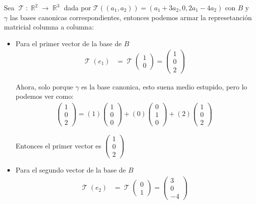 \documentclass[12pt, fleqn]{report}                             %
\theoremstyle{break}                                            %
\DeclareMathOperator \Reals        {\mathbb{R}}                 %
\DeclareMathOperator \LinTrans      {\mathcal{T}}               %
\newcommand{\Wrap}[1]           {\left( #1 \right)}             %
\newcommand{\FnLinTrans}[1]{\mathcal{T}\Wrap{#1}}               %
\newcommand{\pVector}[1]                                        %
        { \ensuremath{\begin{pmatrix}#1\end{pmatrix}} }             %
\begin{document}
                    Sea $\LinTrans: \Reals^2 \to \Reals^3$ dada por $\FnLinTrans{(a_1, a_2)} = (a_1 +3a_2, 0, 2a_1-4a_2)$
                    con $B$ y $\gamma$ las bases canonicas correspondientes, entonces
                    podemos armar la represetanción matricial columna a columna:

                    \begin{itemize}
                        \item Para el primer vector de la base de $B$
                            \begin{align*}
                                \LinTrans(e_1) 
                                    &= \LinTrans\pVector{1\\0}          
                                    = \pVector{1\\0\\2}            
                            \end{align*}

                            Ahora, solo porque $\gamma$ es la base canonica, esto suena medio estupido, pero
                            lo podemos ver como:
                            \begin{align*}
                                \pVector{1\\0\\2} 
                                    = (1)\pVector{1\\0\\0} + (0)\pVector{0\\1\\0} + (2)\pVector{1\\0\\2}
                            \end{align*}

                            Entonces el primer vector es $\pVector{1\\0\\2}$

                        \item Para el segundo vector de la base de $B$
                            \begin{align*}
                                \LinTrans(e_2) 
                                    &= \LinTrans\pVector{0\\1}          
                                    = \pVector{3\\0\\-4}            
                            \end{align*}


\end{itemize}
\end{document}
